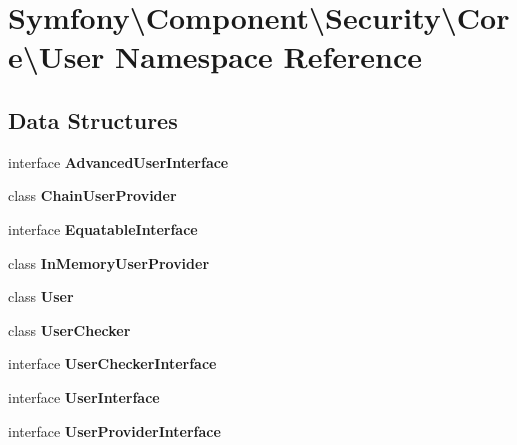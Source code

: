 \section{Symfony\textbackslash{}Component\textbackslash{}Security\textbackslash{}Core\textbackslash{}User Namespace Reference}
\label{namespace_symfony_1_1_component_1_1_security_1_1_core_1_1_user}
\subsection*{Data Structures}
\begin{DoxyCompactItemize}
\item 
interface {\bf Advanced\+User\+Interface}
\item 
class {\bf Chain\+User\+Provider}
\item 
interface {\bf Equatable\+Interface}
\item 
class {\bf In\+Memory\+User\+Provider}
\item 
class {\bf User}
\item 
class {\bf User\+Checker}
\item 
interface {\bf User\+Checker\+Interface}
\item 
interface {\bf User\+Interface}
\item 
interface {\bf User\+Provider\+Interface}
\end{DoxyCompactItemize}
